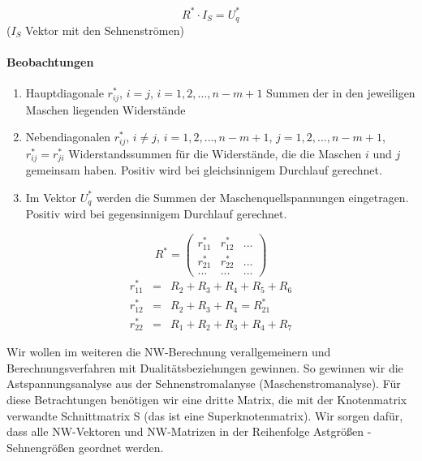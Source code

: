 \documentclass[german]{article}
\begin{document}
\[
	R^* \cdot I_S = U_q^*
\]
($I_S$ Vektor mit den Sehnenströmen)

\paragraph{Beobachtungen}
\begin{enumerate}
	\item Hauptdiagonale $r_{ij}^*$, $i = j$, $i = 1, 2, \ldots, n-m+1$ Summen der in den jeweiligen Maschen liegenden Widerstände
	\item Nebendiagonalen $r_{ij}^*$, $i \neq j$, $i = 1, 2, \ldots, n-m+1$, $j = 1, 2, \ldots, n - m + 1$, $r_{ij}^* = r_{ji}^*$ Widerstandssummen für die Widerstände, die die Maschen $i$ und $j$ gemeinsam haben. Positiv wird bei gleichsinnigem Durchlauf gerechnet.
	\item Im Vektor $U_q^*$ werden die Summen der Maschenquellspannungen eingetragen. Positiv wird bei gegensinnigem Durchlauf gerechnet.
\end{enumerate}


\[
	R^* = 
	\begin{pmatrix}
		r_{11}^* & r_{12}^* & ... \\
		r_{21}^* & r_{22}^* & ... \\
		... & ... & ...
	\end{pmatrix}
\]
\begin{eqnarray*}
	r_{11}^* & = & R_2 + R_3 + R_4 + R_5 + R_6 \\
	r_{12}^* & = & R_2 + R_3 + R_4 = R_{21}^* \\
	r_{22}^* & = & R_1 + R_2 + R_3 + R_4 + R_7
\end{eqnarray*}



Wir wollen im weiteren die NW-Berechnung verallgemeinern und Berechnungsverfahren mit Dualitätsbeziehungen gewinnen. So gewinnen wir die Astspannungsanalyse aus der Sehnenstromalanyse (Maschenstromanalyse). Für diese Betrachtungen benötigen wir eine dritte Matrix, die mit der Knotenmatrix verwandte Schnittmatrix S (das ist eine Superknotenmatrix). Wir sorgen dafür, dass alle NW-Vektoren und NW-Matrizen in der Reihenfolge
{\color{red} Astgrößen} - {\color{blue} Sehnengrößen}
geordnet werden.
\end{document}
